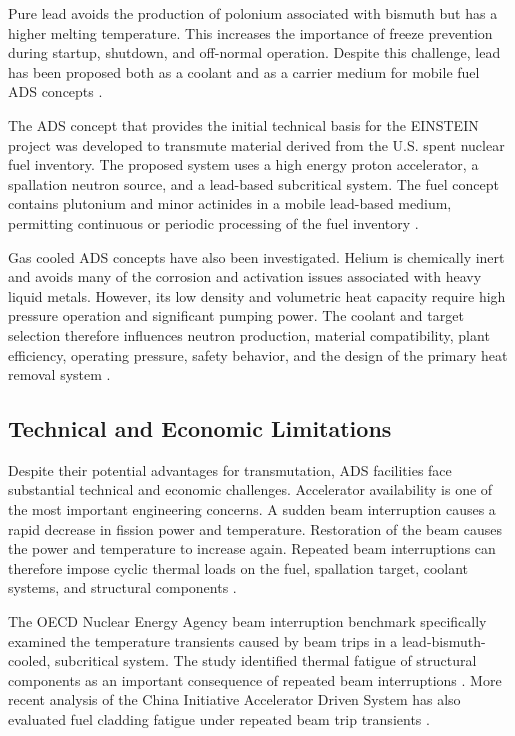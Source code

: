 Pure lead avoids the production of polonium associated with bismuth but has
a higher melting temperature. This increases the importance of freeze
prevention during startup, shutdown, and off-normal operation. Despite this
challenge, lead has been proposed both as a coolant and as a carrier medium
for mobile fuel \gls{ADS} concepts \cite{nea_ads_components_2010,gohar_ads_2021}.

The \gls{ADS} concept that provides the initial technical basis for the \gls{EINSTEIN}
project was developed to transmute material derived from the U.S. spent
nuclear fuel inventory. The proposed system uses a high energy proton
accelerator, a spallation neutron source, and a lead-based subcritical system.
The fuel concept contains plutonium and minor actinides in a mobile
lead-based medium, permitting continuous or periodic processing of the fuel
inventory \cite{gohar_ads_2021}.

Gas cooled \gls{ADS} concepts have also been investigated. Helium is chemically
inert and avoids many of the corrosion and activation issues associated with
heavy liquid metals. However, its low density and volumetric heat capacity
require high pressure operation and significant pumping power. The coolant
and target selection therefore influences neutron production, material
compatibility, plant efficiency, operating pressure, safety behavior, and
the design of the primary heat removal system
\cite{nea_ads_components_2010}.

\subsection{Technical and Economic Limitations}
\label{subsec:ads-limitations}

Despite their potential advantages for transmutation, \gls{ADS} facilities face
substantial technical and economic challenges. Accelerator availability is
one of the most important engineering concerns. A sudden beam interruption
causes a rapid decrease in fission power and temperature. Restoration of the
beam causes the power and temperature to increase again. Repeated beam
interruptions can therefore impose cyclic thermal loads on the fuel,
spallation target, coolant systems, and structural components
\cite{nea_beam_interruptions_2004}.

The \gls{OECD} Nuclear Energy Agency beam interruption benchmark specifically
examined the temperature transients caused by beam trips in a
lead-bismuth-cooled, subcritical system. The study identified thermal
fatigue of structural components as an important consequence of repeated
beam interruptions \cite{nea_beam_interruptions_2004}. More recent analysis
of the China Initiative Accelerator Driven System has also evaluated fuel
cladding fatigue under repeated beam trip transients
\cite{wang_beam_trips_2024}.

